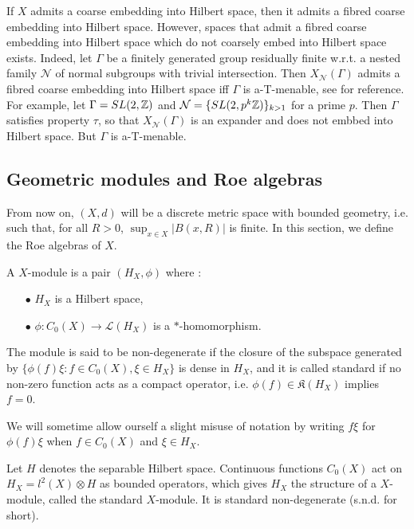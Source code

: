 \begin{rk} If $X$ admits a coarse embedding into Hilbert space, then it admits a fibred coarse embedding into Hilbert space. However, spaces that admit a fibred coarse embedding into Hilbert space which do not coarsely embed into Hilbert space exists. Indeed, let $\Gamma$ be a finitely generated group residually finite w.r.t. a nested family $\mathcal N$ of normal subgroups with trivial intersection. Then $X_{\mathcal N}(\Gamma)$ admits a fibred coarse embedding into Hilbert space iff $\Gamma$ is a-T-menable, see \cite{FinnSellFibred} for reference. For example, let $\Gamma = SL(2,\mathbb Z)$ and $\mathcal N= \{SL(2,p^k\mathbb Z)\}_{k>1}$ for a prime $p$. Then $\Gamma$ satisfies property $\tau$, so that $X_{\mathcal N}(\Gamma)$ is an expander and does not embbed into Hilbert space. But $\Gamma$ is a-T-menable.
\end{rk}


\subsection{Geometric modules and Roe algebras}

From now on, $(X,d)$ will be a discrete metric space with bounded geometry, i.e. such that, for all $R>0$, $\sup_{x\in X} |B(x,R)|$ is finite. In this section, we define the Roe algebras of $X$. 

\begin{definition} A $X$-module is a pair $(H_X,\phi)$ where :
\begin{itemize}
\item[$\bullet$] $H_X$ is a Hilbert space,
\item[$\bullet$] $\phi : C_0(X)\rightarrow \mathcal L(H_X)$ is a $*$-homomorphism. 
\end{itemize}
The module is said to be non-degenerate if the closure of the subspace generated by $\{\phi(f)\xi : f\in C_0(X), \xi\in H_X\}$ is dense in $H_X$, and it is called standard if no non-zero function acts as a compact operator, i.e. $\phi(f) \in\mathfrak K(H_X)$ implies $f=0$.
\end{definition}

We will sometime allow ourself a slight misuse of notation by writing $f\xi$ for $\phi(f)\xi$ when $f\in C_0(X)$ and $\xi \in H_X$.

\begin{Expl}
Let $H$ denotes the separable Hilbert space. Continuous functions $C_0(X)$ act on $H_X =l^2(X)\otimes H$ as bounded operators, which gives $H_X$ the structure of a $X$-module, called the standard $X$-module. It is standard non-degenerate (s.n.d. for short).  
\end{Expl}

